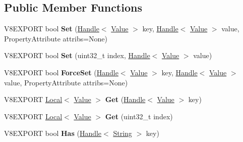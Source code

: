 \subsection*{Public Member Functions}
\begin{DoxyCompactItemize}
\item 
\hypertarget{classv8_1_1_object_a97717c7b7fdc556c3a7fad14877ca912}{}V8\+E\+X\+P\+O\+R\+T bool {\bfseries Set} (\hyperlink{classv8_1_1_handle}{Handle}$<$ \hyperlink{classv8_1_1_value}{Value} $>$ key, \hyperlink{classv8_1_1_handle}{Handle}$<$ \hyperlink{classv8_1_1_value}{Value} $>$ value, Property\+Attribute attribs=None)\label{classv8_1_1_object_a97717c7b7fdc556c3a7fad14877ca912}

\item 
\hypertarget{classv8_1_1_object_aa588c4de7f0e4db47a2f22acfaa774fd}{}V8\+E\+X\+P\+O\+R\+T bool {\bfseries Set} (uint32\+\_\+t index, \hyperlink{classv8_1_1_handle}{Handle}$<$ \hyperlink{classv8_1_1_value}{Value} $>$ value)\label{classv8_1_1_object_aa588c4de7f0e4db47a2f22acfaa774fd}

\item 
\hypertarget{classv8_1_1_object_a42bf74b18b3d9280612620df3d2c13e0}{}V8\+E\+X\+P\+O\+R\+T bool {\bfseries Force\+Set} (\hyperlink{classv8_1_1_handle}{Handle}$<$ \hyperlink{classv8_1_1_value}{Value} $>$ key, \hyperlink{classv8_1_1_handle}{Handle}$<$ \hyperlink{classv8_1_1_value}{Value} $>$ value, Property\+Attribute attribs=None)\label{classv8_1_1_object_a42bf74b18b3d9280612620df3d2c13e0}

\item 
\hypertarget{classv8_1_1_object_a59bd849c1cdb2aa1033423ee21b2ede9}{}V8\+E\+X\+P\+O\+R\+T \hyperlink{classv8_1_1_local}{Local}$<$ \hyperlink{classv8_1_1_value}{Value} $>$ {\bfseries Get} (\hyperlink{classv8_1_1_handle}{Handle}$<$ \hyperlink{classv8_1_1_value}{Value} $>$ key)\label{classv8_1_1_object_a59bd849c1cdb2aa1033423ee21b2ede9}

\item 
\hypertarget{classv8_1_1_object_a7310ce3ee18744c0971356dad8e2bed1}{}V8\+E\+X\+P\+O\+R\+T \hyperlink{classv8_1_1_local}{Local}$<$ \hyperlink{classv8_1_1_value}{Value} $>$ {\bfseries Get} (uint32\+\_\+t index)\label{classv8_1_1_object_a7310ce3ee18744c0971356dad8e2bed1}

\item 
\hypertarget{classv8_1_1_object_ada7a824246df2e8a9b7476bd63a54b2e}{}V8\+E\+X\+P\+O\+R\+T bool {\bfseries Has} (\hyperlink{classv8_1_1_handle}{Handle}$<$ \hyperlink{classv8_1_1_string}{String} $>$ key)\label{classv8_1_1_object_ada7a824246df2e8a9b7476bd63a54b2e}


\end{DoxyCompactItemize}
